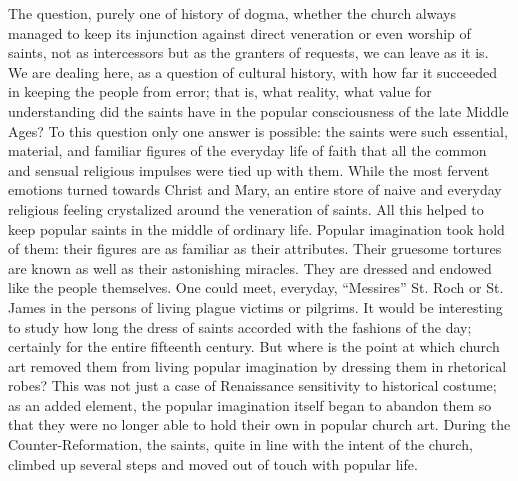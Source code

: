 The question, purely one of history of dogma, whether the church always
managed to keep its injunction against direct veneration or even worship
of saints, not as intercessors but as the granters of requests, we can
leave as it is. We are dealing here, as a question of cultural history,
with how far it succeeded in keeping the people from error; that is,
what reality, what value for understanding did the saints have in the
popular consciousness of the late Middle Ages? To this question only one
answer is possible: the saints were such essential, material, and
familiar figures of the everyday life of faith that all the common and
sensual religious impulses were tied up with them. While the most
fervent emotions turned towards Christ and Mary, an entire store of
naive and everyday religious feeling crystalized around the veneration
of saints. All this helped to keep popular saints in the middle of
ordinary life. Popular imagination took hold of them: their figures are
as familiar as their attributes. Their gruesome tortures are known as
well as their astonishing miracles. They are dressed and endowed like
the people themselves. One could meet, everyday, ``Messires'' St. Roch
or St.
\protect\hypertarget{13_Chapter_Six__THE_DEPICTION_OF_TH.xhtmlux5cux23page_192}{}{}James
in the persons of living plague victims or pilgrims. It would be
interesting to study how long the dress of saints accorded with the
fashions of the day; certainly for the entire fifteenth century. But
where is the point at which church art removed them from living popular
imagination by dressing them in rhetorical robes? This was not just a
case of Renaissance sensitivity to historical costume; as an added
element, the popular imagination itself began to abandon them so that
they were no longer able to hold their own in popular church art. During
the Counter-Reformation, the saints, quite in line with the intent of
the church, climbed up several steps and moved out of touch with popular
life.

